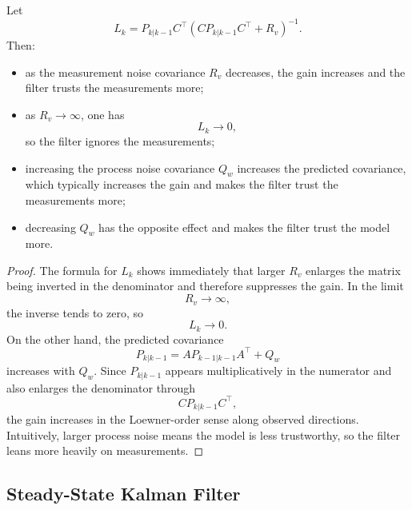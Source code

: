 \begin{proposition}\label{prop:l7-limiting-behavior-of-the-kalman-gain-with-respect-to-noise-levels}
	Let
	\[
		L_k = P_{k|k-1}C^\top\left(CP_{k|k-1}C^\top+R_v\right)^{-1}.
	\]
	Then:
	\begin{itemize}
		\item as the measurement noise covariance $R_v$ decreases, the gain increases and the filter trusts the measurements more;
		\item as $R_v \to \infty$, one has
		      \[
			      L_k \to 0,
		      \]
		      so the filter ignores the measurements;
		\item increasing the process noise covariance $Q_w$ increases the predicted covariance, which typically increases the gain and makes the filter trust the measurements more;
		\item decreasing $Q_w$ has the opposite effect and makes the filter trust the model more.
	\end{itemize}
\end{proposition}
\begin{proof}
	The formula for $L_k$ shows immediately that larger $R_v$ enlarges the matrix being inverted in the denominator and therefore suppresses the gain. In the limit
	\[
		R_v \to \infty,
	\]
	the inverse tends to zero, so
	\[
		L_k \to 0.
	\]
	On the other hand, the predicted covariance
	\[
		P_{k|k-1}=A P_{k-1|k-1}A^\top + Q_w
	\]
	increases with $Q_w$. Since $P_{k|k-1}$ appears multiplicatively in the numerator and also enlarges the denominator through
	\[
		CP_{k|k-1}C^\top,
	\]
	the gain increases in the Loewner-order sense along observed directions. Intuitively, larger process noise means the model is less trustworthy, so the filter leans more heavily on measurements.
\end{proof}

\subsection{Steady-State Kalman Filter}
\label{sec:l7-steady-state-kalman-filter}

